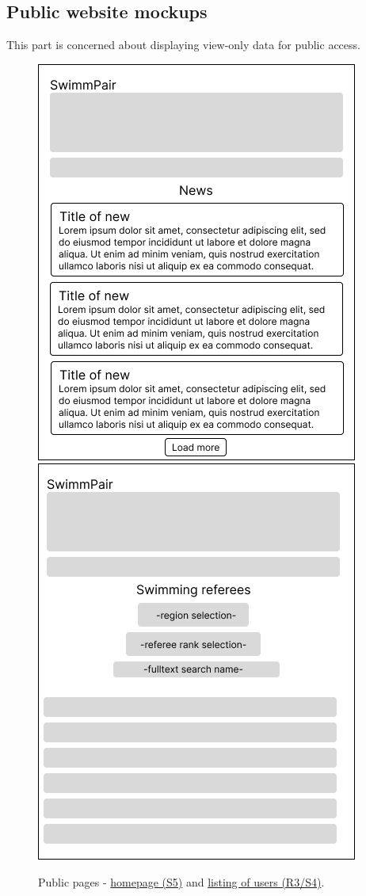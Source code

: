 \subsection*{Public website mockups}
This part is concerned about displaying view-only data for public access.
\begin{figure}[h]	
	\centering	
    \includegraphics[scale=0.457]{img/def-U-Main.png}
    \includegraphics[scale=0.457]{img/def-U-ListingUsers.png}
	\caption{Public pages - \underline{homepage (S5)} and \underline{listing of users (R3/S4)}.}
	\label{fig2.2:fepublicpages1}
\end{figure}
